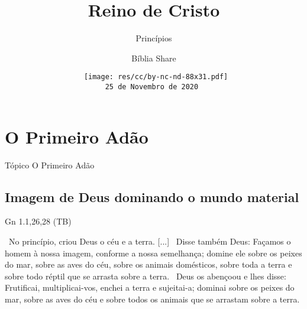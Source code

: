 \documentclass[12pt,aspectratio=169]{beamer}
\title[Reino de Cristo -- Princípios]{Reino de Cristo}
\subtitle{Princípios}
\author{Bíblia Share}
\date[{\tiny\tt 25 de Novembro de 2020}]{{\scriptsize\tt%
    \texttt{[image: res/cc/by-nc-nd-88x31.pdf]}\\[\smallskipamount]
    25 de Novembro de 2020
}}
\newcommand{\ver}[1]{%
    \raisebox{0.50ex}{%
        \scalebox{1.1}{%
            \pmb{\textbf{\textcolor{BSpbg}{#1}}}%
        }%
    }%
}
\newcommand{\QUOTE}[1]{%
    \par\noindent\hspace*{0.05\linewidth}%
    \begin{minipage}{0.9\linewidth}%
        \linespread{1.35}\large{#1}%
    \end{minipage}%
}
\newcommand{\YEL}[1]{{\textcolor{TXyel}{#1}}}
\newcommand{\CYA}[1]{{\textcolor{TXcya}{#1}}}
\newcommand{\MAG}[1]{{\textcolor{TXmag}{#1}}}
\begin{document}
\begin{frame}
    \titlepage
\end{frame}
\section{O Primeiro Adão}

    \begin{frame}
        \par\noindent\hspace*{0.05\linewidth}%
        \begin{minipage}{0.9\linewidth}%
            \large%
            \begin{alertblock}{Tópico}
                O Primeiro Adão
            \end{alertblock}
        \end{minipage}%
    \end{frame}

    \subsection{Imagem de Deus dominando o mundo material}

    \begin{frame}{Gn 1.1,26,28 (TB)}
        \QUOTE{%
            \ver{1}~No princípio, criou Deus o \CYA{céu} e a \YEL{terra}. [...]
            \ver{26}~Disse também Deus: Façamos o \YEL{homem} \MAG{à nossa imagem}, conforme a
            \MAG{nossa semelhança}; \YEL{domine ele} sobre os peixes do mar, sobre as aves do
            céu, sobre os animais domésticos, \YEL{sobre toda a terra} e sobre todo réptil que
            se arrasta sobre a terra.
            \ver{28}~Deus os abençoou e lhes disse: Frutificai, multiplicai-vos, \YEL{enchei a
            terra} e \YEL{sujeitai-a}; \YEL{dominai} sobre os peixes do mar, sobre as aves do
            céu e sobre todos os animais que se arrastam sobre a terra.
        }
    \end{frame}
\end{document}
